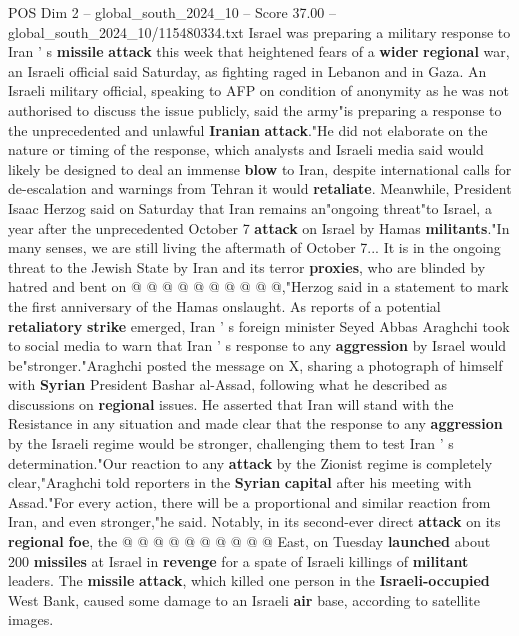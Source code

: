 \begin{textsample}{POS Dim 2 – global\_south\_2024\_10 – Score 37.00 – global\_south\_2024\_10/115480334.txt}  \label{ex:f2_pos_023}
Israel was preparing a military response to Iran ' s \textbf{missile} \textbf{attack} this week that heightened fears of a \textbf{wider} \textbf{regional} war, an Israeli official said Saturday, as fighting raged in Lebanon and in Gaza.
An Israeli military official, speaking to AFP on condition of anonymity as he was not authorised to discuss the issue publicly, said the army"is preparing a response to the unprecedented and unlawful \textbf{Iranian} \textbf{attack}."He did not elaborate on the nature or timing of the response, which analysts and Israeli media said would likely be designed to deal an immense \textbf{blow} to Iran, despite international calls for de-escalation and warnings from Tehran it would \textbf{retaliate}.
Meanwhile, President Isaac Herzog said on Saturday that Iran remains an"ongoing threat"to Israel, a year after the unprecedented October 7 \textbf{attack} on Israel by Hamas \textbf{militants}."In many senses, we are still living the aftermath of October 7...
It is in the ongoing threat to the Jewish State by Iran and its terror \textbf{proxies}, who are blinded by hatred and bent on @ @ @ @ @ @ @ @ @ @,"Herzog said in a statement to mark the first anniversary of the Hamas onslaught.
As reports of a potential \textbf{retaliatory} \textbf{strike} emerged, Iran ' s foreign minister Seyed Abbas Araghchi took to social media to warn that Iran ' s response to any \textbf{aggression} by Israel would be"stronger."Araghchi posted the message on X, sharing a photograph of himself with \textbf{Syrian} President Bashar al-Assad, following what he described as discussions on \textbf{regional} issues.
He asserted that Iran will stand with the Resistance in any situation and made clear that the response to any \textbf{aggression} by the Israeli regime would be stronger, challenging them to test Iran ' s determination."Our reaction to any \textbf{attack} by the Zionist regime is completely clear,"Araghchi told reporters in the \textbf{Syrian} \textbf{capital} after his meeting with Assad."For every action, there will be a proportional and similar reaction from Iran, and even stronger,"he said.
Notably, in its second-ever direct \textbf{attack} on its \textbf{regional} \textbf{foe}, the @ @ @ @ @ @ @ @ @ @ East, on Tuesday \textbf{launched} about 200 \textbf{missiles} at Israel in \textbf{revenge} for a spate of Israeli killings of \textbf{militant} leaders.
The \textbf{missile} \textbf{attack}, which killed one person in the \textbf{Israeli-occupied} West Bank, caused some damage to an Israeli \textbf{air} base, according to satellite images.

\end{textsample}
